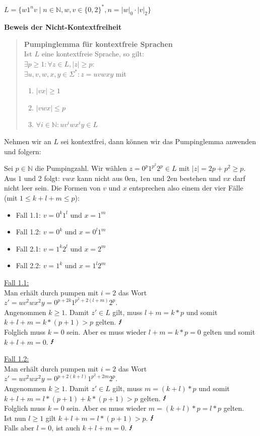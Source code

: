 \begin{teile}
	\item
	$L = \{w1^n v \mid n \in \mathbb{N}, w, v \in \{0,2\}^*, n = |w|_0 \cdot |v|_2 \}$		
	
	\textbf{Beweis der Nicht-Kontextfreiheit}
	\begin{quote}
		\textbf{Pumpinglemma für kontextfreie Sprachen} \\
		Ist $L$ eine kontextfreie Sprache, so gilt: \\
		$\exists p \geq 1: \forall z \in L, |z| \geq p:$ \\
		$\exists u,v,w,x,y \in \Sigma^*: z = uvwxy$ mit
		\begin{enumerate}
			\item $|vx| \geq 1$
			\item $|vwx| \leq p$
			\item $\forall i \in \mathbb{N} : uv^{i}wx^{i}y \in L$
		\end{enumerate}
	\end{quote}
  	
	Nehmen wir an $L$ sei kontextfrei, dann können wir das Pumpinglemma anwenden und folgern:

	Sei $p \in \mathbb{N}$ die Pumpingzahl. Wir wählen $z = 0^p1^{p^2}2^p \in L$ mit $|z|=2p+p^2\geq p$.\\
	Aus $1$ und $2$ folgt: $vwx$ kann nicht aus $0$en, $1$en und $2$en bestehen und $vx$ darf nicht leer sein. Die Formen von $v$ und $x$ entsprechen also einem der vier Fälle (mit $1 \leq k+l+m \leq p$):
	\begin{itemize}
		\item Fall 1.1: $v=0^k1^l$ und $x=1^m$
		\item Fall 1.2: $v=0^k$ und $x=0^l1^m$
		\item Fall 2.1: $v=1^k2^l$ und $x=2^m$
		\item Fall 2.2: $v=1^k$ und $x=1^l2^m$
	\end{itemize}

	\underline{Fall 1.1:}\\
	Man erhält durch pumpen mit $i = 2$ das Wort $z'=uv^2wx^2y=0^{p+2k}1^{p^2+2(l+m)}2^{p}$.\\
	Angenommen $k\geq 1$. Damit $z' \in L$ gilt, muss $l+m = k*p$ und somit $k+l+m=k*(p+1)>p$ gelten. $\mbox{\Lightning}$\\
	Folglich muss $k=0$ sein. Aber es muss wieder $l+m = k*p = 0$ gelten und somit $k+l+m=0$. $\mbox{\Lightning}$

	\underline{Fall 1.2:}\\
	Man erhält durch pumpen mit $i = 2$ das Wort $z'=uv^2wx^2y=0^{p+2(k+l)}1^{p^2+2m}2^{p}$.\\
	Angenommen $k\geq 1$. Damit $z' \in L$ gilt, muss $m = (k+l)*p$ und somit $k+l+m=l*(p+1)+k*(p+1)>p$ gelten. $\mbox{\Lightning}$\\
	Folglich muss $k=0$ sein. Aber es muss wieder $m = (k+l)*p = l*p$ gelten.\\
	Ist nun $l\geq 1$ gilt $k+l+m=l*(p+1)>p$. $\mbox{\Lightning}$\\
	Falls aber $l=0$, ist auch $k+l+m=0$. $\mbox{\Lightning}$


\end{teile}
